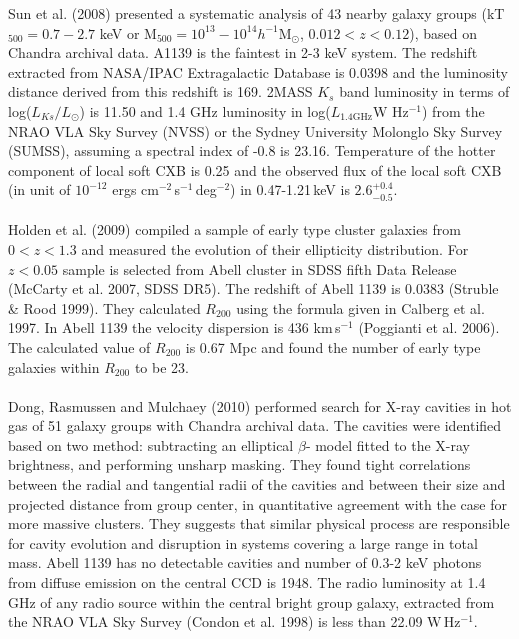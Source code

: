 Sun et al. (2008) presented a systematic analysis of 43 nearby galaxy groups (kT$_{500}=0.7-2.7$ keV or M$_{500}=10^{13}-10^{14}h^{-1}$M$_{\odot}$, $0.012<z<0.12$), based on Chandra archival data. A1139 is the faintest in 2-3 keV system. The redshift extracted from NASA/IPAC Extragalactic Database is 0.0398 and the luminosity distance derived from this redshift is 169. 2MASS $K_s$ band luminosity in terms of log($L_{Ks}/L_{\odot}$) is 11.50 and 1.4 GHz luminosity in log($L_{1.4\text{GHz}}${W Hz}$^{-1}$) from the NRAO VLA Sky Survey (NVSS) or the Sydney University Molonglo Sky Survey (SUMSS), assuming a spectral index of -0.8 is 23.16. Temperature of the hotter component of local soft CXB is 0.25 and the observed flux of the local soft CXB (in unit of $10^{-12}$ ergs cm$^{-2}$\,s$^{-1}$\,deg$^{-2}$) in 0.47-1.21\,keV is $2.6^{+0.4}_{-0.5}$.\\\\
Holden et al. (2009)  compiled a sample of early type cluster galaxies from $0<z<1.3$ and measured the evolution of their ellipticity distribution. For $z<0.05$ sample is selected from Abell cluster in SDSS fifth Data Release (McCarty et al. 2007, SDSS DR5). The redshift of Abell 1139 is 0.0383 (Struble \& Rood 1999). They calculated $R_{200}$ using the formula given in Calberg et al. 1997. In Abell 1139 the velocity dispersion is 436 km\,s$^{-1}$ (Poggianti et al. 2006). The calculated value of $R_{200}$ is 0.67 Mpc and found the number of early type galaxies within $R_{200}$ to be 23.\\\\
Dong, Rasmussen and Mulchaey (2010) performed search for X-ray cavities in hot gas of 51 galaxy groups with Chandra archival data. The cavities were identified based on two method: subtracting an elliptical $\beta$- model fitted to the X-ray brightness, and performing unsharp masking. They found tight correlations between the radial and tangential radii of the cavities and between their size and projected distance from group center, in quantitative agreement with the case for more massive clusters. They suggests that similar physical process are responsible for cavity evolution and disruption in systems covering a large range in total mass. Abell 1139  has no detectable cavities and number of 0.3-2 keV photons from diffuse emission on the central CCD is 1948. The radio luminosity at 1.4 GHz of any radio source within the central bright group galaxy, extracted from the NRAO VLA Sky Survey (Condon et al. 1998) is less than 22.09 W\,Hz$^{-1}$.\\\\
